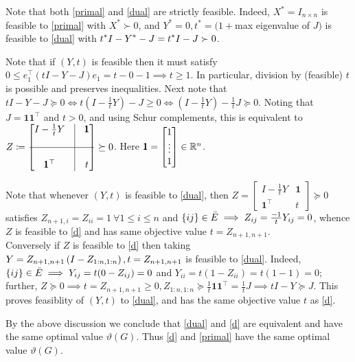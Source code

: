 \begin{enumerate}[leftmargin=*]
Note that both \ref{primal} and \ref{dual} are strictly feasible. Indeed,  $X^{*} = I_{n\times n}$ is feasible to \ref{primal} with $X^{*}\succ 0$, and $Y^{*} = 0, t^{*} = (1+$max eigenvalue of $J)$ is feasible to \ref{dual} with $\displaystyle t^{*}I-Y^{*} - J = t^{*}I-J \succ 0$. 

Note that if $(Y,t)$ is feasible then it must satisfy $0\le e_{1}^{\top}(tI - Y - J)e_{1} = t - 0 - 1 \implies t\ge1$. In particular, division by (feasible) $t$ is possible and preserves inequalities. Next note that $tI - Y - J\succeq 0\iff t\left(I-\frac{1}{t}Y\right) - J\ge 0\iff \left(I-\frac{1}{t}Y\right) - \frac{1}{t}J\succeq 0$. Noting that $J = \pmb 1\pmb 1^{\top}$ and $t>0$, and using Schur complements, this is equivalent to $\ds Z\sett\begin{bmatrix}I-\frac{1}{t}Y&\vline&\pmb 1\\&\vline\\\hline&\vline\\\pmb 1^{\top}&\vline &t\end{bmatrix} \succeq 0$. Here $\pmb 1 = \begin{bmatrix}1\\\vdots\\1\end{bmatrix}\in\mathbb{R}^{n}$.

Note that whenever $(Y,t)$ is feasible to \ref{dual}, then $Z = \begin{bmatrix}I-\frac{1}{t}Y&\pmb 1\\\pmb 1^{\top}&t\end{bmatrix}\succeq 0$ satisfies $Z_{n+1,i} = Z_{ii} = 1~\forall1\le i \le n$ and $\left\{ij\right\}\in \bar E\implies Z_{ij} = \frac{-1}{t}Y_{ij} = 0$, whence $Z$ is feasible to \ref{d} and has same objective value $t=Z_{n+1,n+1}.$ \\
Conversely if $Z$ is feasible to \ref{d} then taking $\displaystyle Y=Z_{n+1,n+1}\left(I-Z_{1:n,1:n}\right), t = Z_{n+1,n+1}$ is feasible to \ref{dual}. Indeed, $\left\{ij\right\}\in\bar E\implies Y_{ij} = t(0-Z_{ij}) = 0$ and $Y_{ii} = t(1-Z_{ii}) = t(1-1) = 0$; further, $Z\succeq 0\implies t = Z_{n+1,n+1}\ge 0, Z_{1:n,1:n} \succeq \frac1t \pmb 1\pmb1^{\top} = \frac{1}{t}J\implies tI-Y \succeq J$. This proves feasiblity of $(Y,t)$ to \ref{dual}, and has the same objective value $t$ as \ref{d}. 

By the above discussion we conclude that \ref{dual} and \ref{d} are equivalent and have the same optimal value $\vartheta(G)$. Thus \ref{d} and \ref{primal} have the same optimal value $\vartheta(G)$. 



\end{enumerate}
